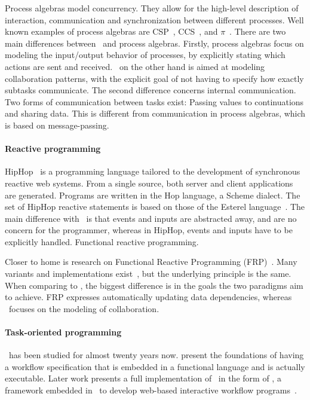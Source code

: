 Process algebras model concurrency.
They allow for the high-level description of interaction, communication and synchronization between different processes.
Well known examples of process algebras are CSP~\cite{books/ph/Hoare85}, CCS~\cite{books/ph/Milner89}, and $\pi$~\cite{DBLP:books/daglib/0098267}.
There are two main differences between \TOP\ and process algebras.
Firstly, process algebras focus on modeling the input/output behavior of processes, by explicitly stating which actions are sent and received.
\TOP\ on the other hand is aimed at modeling collaboration patterns, with the explicit goal of not having to specify how exactly subtasks communicate.
The second difference concerns internal communication.
Two forms of communication between tasks exist: Passing values to continuations and sharing data.
This is different from communication in process algebras, which is based on message-passing.


\paragraph{Reactive programming}

HipHop~\cite{conf/icdcit/BerryS14,journals/corr/BerryS13} is a programming language tailored to the development of synchronous reactive web systems.
From a single source, both server and client applications are generated.
Programs are written in the Hop language, a Scheme dialect.
The set of HipHop reactive statements is based on those of the Esterel language~\cite{journals/scp/BerryG92}.
The main difference with \TOPHAT\ is that events and inputs are abstracted away, and are no concern for the programmer, whereas in HipHop, events and inputs have to be explicitly handled.
Functional reactive programming.

Closer to home is research on Functional Reactive Programming (FRP)~\cite{conf/icfp/ElliottH97}.
Many variants and implementations exist~\cite{reactive-banana,CooperK04,conf/oopsla/MeyerovichGBCGBK09}, but the underlying principle is the same.
When comparing to \TOP, the biggest difference is in the goals the two paradigms aim to achieve.
FRP expresses automatically updating data dependencies, whereas \TOP\ focuses on the modeling of collaboration.


\paragraph{Task-oriented programming}

\TOP\ has been studied for almost twenty years now.
\citet{conf/icfp/PlasmeijerAK07} present the foundations of having a workflow specification that is embedded in a functional language and is actually executable.
Later work presents a full implementation of \TOP\ in the form of \ITASKS, a framework embedded in \CLEAN\ to develop web-based interactive workflow programs~\cite{conf/ppdp/PlasmeijerLMAK12}.

